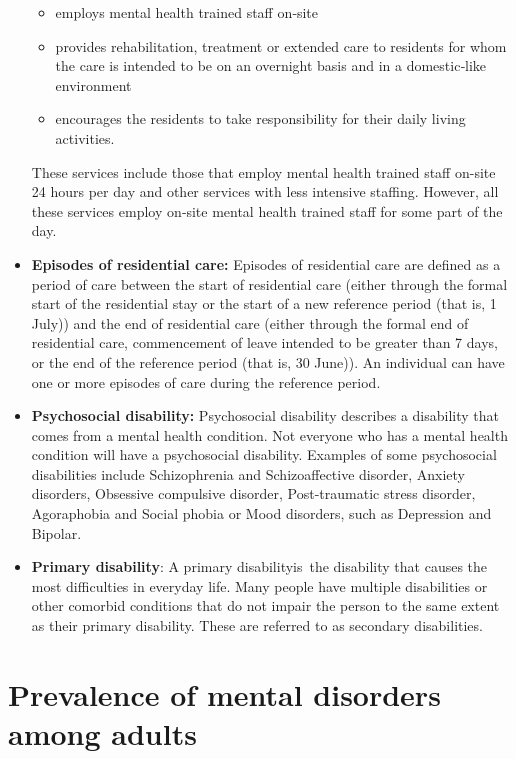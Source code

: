 \documentclass[
  a4paper,
  DIV=11,
  numbers=noendperiod]{scrreport}
\begin{document}
\begin{itemize}
  \begin{itemize}
  \item
    employs mental health trained staff on‑site
  \item
    provides rehabilitation, treatment or extended care to residents for
    whom the care is intended to be on an overnight basis and in a
    domestic‑like environment
  \item
    encourages the residents to take responsibility for their daily
    living activities.
  \end{itemize}

  These services include those that employ mental health trained staff
  on-site 24 hours per day and other services with less intensive
  staffing. However, all these services employ on‑site mental health
  trained staff for some part of the day.
\item
  \textbf{Episodes of residential care:} Episodes of residential care
  are defined as a period of care between the start of residential care
  (either through the formal start of the residential stay or the start
  of a new reference period (that is, 1 July)) and the end of
  residential care (either through the formal end of residential care,
  commencement of leave intended to be greater than 7 days, or the end
  of the reference period (that is, 30 June)). An individual can have
  one or more episodes of care during the reference period.
\item
  \textbf{Psychosocial disability:} Psychosocial disability describes a
  disability that comes from a mental health condition. Not everyone who
  has a mental health condition will have a psychosocial disability.
  Examples of some psychosocial disabilities include Schizophrenia and
  Schizoaffective disorder, Anxiety disorders, Obsessive compulsive
  disorder, Post-traumatic stress disorder, Agoraphobia and Social
  phobia or Mood disorders, such as Depression and Bipolar.
\item
  \textbf{Primary disability}: A primary disabilityis~the disability
  that causes the most difficulties in everyday life. Many people have
  multiple disabilities or other comorbid conditions that do not impair
  the person to the same extent as their primary disability. These are
  referred to as secondary disabilities.
\end{itemize}


\hypertarget{prevalence-of-mental-disorders-among-adults}{%
\chapter{Prevalence of mental disorders among
adults}\label{prevalence-of-mental-disorders-among-adults}}
\end{document}
